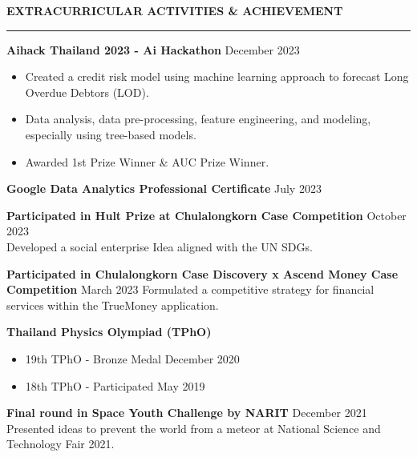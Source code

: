 \documentclass[11pt]{article}
\begin{document}
\vspace{12pt}

\textbf{EXTRACURRICULAR ACTIVITIES \& ACHIEVEMENT}
\vspace{5pt}
{\color{NavyBlue}\hrule}
\vspace{9pt}

\textbf{Aihack Thailand 2023 - Ai Hackathon} \hfill December 2023
\begin{itemize}[noitemsep, topsep=0pt, partopsep=0pt, parsep=0pt]
    \item Created a credit risk model using machine learning approach to forecast Long Overdue Debtors (LOD).
    \item Data analysis, data pre-processing, feature engineering, and modeling, especially using tree-based models.
    \item Awarded 1st Prize Winner \& AUC Prize Winner.
\end{itemize}

\vspace{6pt}

\textbf{Google Data Analytics Professional Certificate} \hfill July 2023

\vspace{6pt}

\textbf{Participated in Hult Prize at Chulalongkorn Case Competition} \hfill October 2023\\
\hspace*{7pt} Developed a social enterprise Idea aligned with the UN SDGs.

\vspace{6pt}

\textbf{Participated in Chulalongkorn Case Discovery x Ascend Money Case Competition} \hfill March 2023
\hspace*{7pt} Formulated a competitive strategy for financial services within the TrueMoney application.

\vspace{6pt}

\textbf{Thailand Physics Olympiad (TPhO)}
\begin{itemize}[noitemsep, topsep=0pt, partopsep=0pt, parsep=0pt]
    \item 19th TPhO - Bronze Medal \hfill December 2020
    \item 18th TPhO - Participated \hfill May 2019
\end{itemize}


\vspace{6pt}

\textbf{Final round in Space Youth Challenge by NARIT} \hfill December 2021\\
\hspace*{7pt} Presented ideas to prevent the world from a meteor at National Science and Technology Fair 2021.
\end{document}

